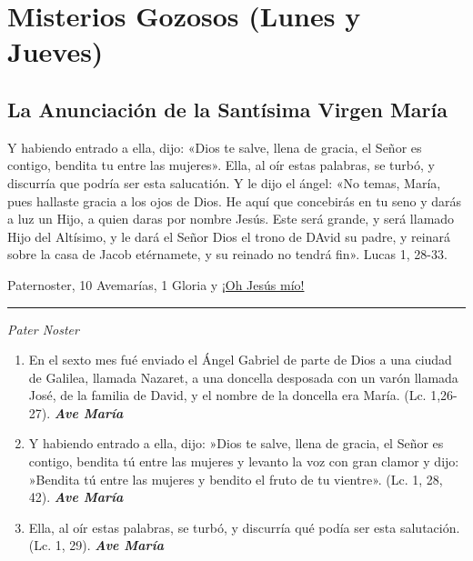 \documentclass[a4paper,11pt, oneside]{report}
\begin{document}
\section*{Misterios Gozosos (Lunes y Jueves)}\label{sec:gozosos}
{  
  \subsection*{La Anunciación de la Santísima Virgen María}
  {
    Y habiendo entrado a ella, dijo: «Dios te salve, llena de gracia, el Señor es contigo, bendita tu entre las mujeres». Ella, al oír estas palabras, se turbó,
    y discurría que podría ser esta salucatión. Y le dijo el ángel: «No temas, María, pues hallaste gracia a los ojos de Dios. He aquí que concebirás en tu seno
    y darás a luz un Hijo, a quien daras por nombre Jesús. Este será grande, y será llamado Hijo del Altísimo, y le dará el Señor Dios el trono de DAvid su padre,
    y reinará sobre la casa de Jacob etérnamete, y su reinado no tendrá fin». Lucas 1, 28-33.
    
     Paternoster, 10 Avemarías, 1 Gloria y \hyperlink{finalAnunciacion}{¡Oh Jesús mío!}
    
    \medskip

    \begin{center}\rule{1\linewidth}{\linethickness}\end{center}

    \medskip

    \textit{Pater Noster}
      
    \begin{enumerate}
      \item En el sexto mes fué enviado el Ángel Gabriel de parte de Dios a una ciudad de Galilea, llamada Nazaret, a una 
      doncella desposada con un varón llamada José, de la familia de David, y el nombre de la doncella era María. (Lc. 1,26- 27). \textbf{\textit{Ave María}}

      \item Y habiendo entrado a ella, dijo: »Dios te salve, llena de gracia, el Señor es contigo, bendita tú entre las mujeres 
      y levanto la voz con gran clamor y dijo: »Bendita tú entre las mujeres y bendito el fruto de tu vientre». (Lc. 1, 28, 42). \textbf{\textit{Ave María}}

      \item Ella, al oír estas palabras, se turbó, y discurría qué podía ser esta salutación. (Lc. 1, 29). \textbf{\textit{Ave María}}


\end{enumerate}}}
\end{document}
